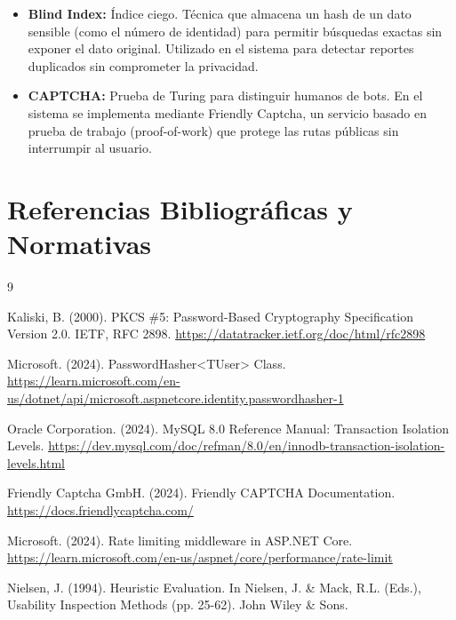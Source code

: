 \documentclass[12pt,letterpaper]{article}
\begin{document}
\begin{itemize}
    \item \textbf{Blind Index:} Índice ciego. Técnica que almacena un hash de un dato sensible (como el número de identidad) para permitir búsquedas exactas sin exponer el dato original. Utilizado en el sistema para detectar reportes duplicados sin comprometer la privacidad.
    
    \item \textbf{CAPTCHA:} Prueba de Turing para distinguir humanos de bots. En el sistema se implementa mediante Friendly Captcha, un servicio basado en prueba de trabajo (proof-of-work) que protege las rutas públicas sin interrumpir al usuario.
\end{itemize}
















	\section{Referencias Bibliográficas y Normativas}

\begin{thebibliography}{9}
    
    Kaliski, B. (2000). PKCS \#5: Password-Based Cryptography Specification Version 2.0. IETF, RFC 2898. \url{https://datatracker.ietf.org/doc/html/rfc2898}
    
    Microsoft. (2024). PasswordHasher<TUser> Class. \url{https://learn.microsoft.com/en-us/dotnet/api/microsoft.aspnetcore.identity.passwordhasher-1}

    Oracle Corporation. (2024). MySQL 8.0 Reference Manual: Transaction Isolation Levels. \url{https://dev.mysql.com/doc/refman/8.0/en/innodb-transaction-isolation-levels.html}
	 
    Friendly Captcha GmbH. (2024). Friendly CAPTCHA Documentation. \url{https://docs.friendlycaptcha.com/}

    Microsoft. (2024). Rate limiting middleware in ASP.NET Core. \url{https://learn.microsoft.com/en-us/aspnet/core/performance/rate-limit}

    Nielsen, J. (1994). Heuristic Evaluation. In Nielsen, J. \& Mack, R.L. (Eds.), Usability Inspection Methods (pp. 25-62). John Wiley \& Sons.
\end{thebibliography}
	
\end{document}
